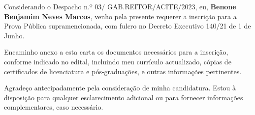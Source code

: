 \documentclass[13pt, a4paper]{awesome-cv} %
\begin{document}
\begin{cvletter}
Considerando o Despacho n.º 03/ GAB.REITOR/ACITE/2023, eu, \textbf{Benone Benjamim Neves Marcos}, venho pela presente requerer a inscrição para a Prova Pública supramencionada, com fulcro no Decreto Executivo 140/21 de 1 de Junho.

Encaminho anexo a esta carta os documentos necessários para a inscrição, conforme indicado no edital, incluindo meu currículo actualizado, cópias de certificados de licenciatura e pós-graduações, e outras informações pertinentes.

Agradeço antecipadamente pela consideração de minha candidatura. Estou à disposição para qualquer esclarecimento adicional ou para fornecer informações complementares, caso necessário.


\end{cvletter}


\makeletterclosing %
\end{document}
